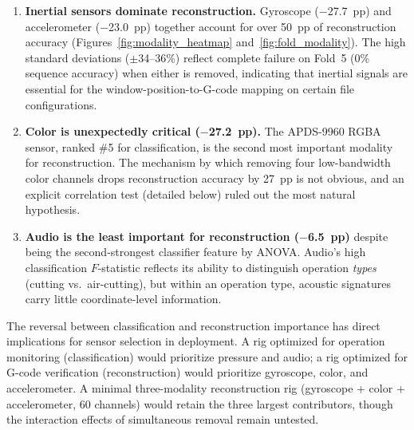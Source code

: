 \documentclass[sensors,article,submit,moreauthors,pdftex]{Definitions/mdpi}
\begin{document}
\begin{enumerate}[leftmargin=*]
    \item \textbf{Inertial sensors dominate reconstruction.} Gyroscope ($-$27.7~pp) and accelerometer ($-$23.0~pp) together account for over 50~pp of reconstruction accuracy (Figures~\ref{fig:modality_heatmap} and~\ref{fig:fold_modality}). The high standard deviations ($\pm$34--36\%) reflect complete failure on Fold~5 (0\% sequence accuracy) when either is removed, indicating that inertial signals are essential for the window-position-to-G-code mapping on certain file configurations.
    \item \textbf{Color is unexpectedly critical ($-$27.2~pp).} The APDS-9960 RGBA sensor, ranked \#5 for classification, is the second most important modality for reconstruction. The mechanism by which removing four low-bandwidth color channels drops reconstruction accuracy by 27~pp is not obvious, and an explicit correlation test (detailed below) ruled out the most natural hypothesis.
    \item \textbf{Audio is the least important for reconstruction ($-$6.5~pp)} despite being the second-strongest classifier feature by ANOVA. Audio's high classification $F$-statistic reflects its ability to distinguish operation \emph{types} (cutting vs.\ air-cutting), but within an operation type, acoustic signatures carry little coordinate-level information.
\end{enumerate}

The reversal between classification and reconstruction importance has direct implications for sensor selection in deployment. A rig optimized for operation monitoring (classification) would prioritize pressure and audio; a rig optimized for G-code verification (reconstruction) would prioritize gyroscope, color, and accelerometer. A minimal three-modality reconstruction rig (gyroscope + color + accelerometer, 60 channels) would retain the three largest contributors, though the interaction effects of simultaneous removal remain untested.
\end{document}
